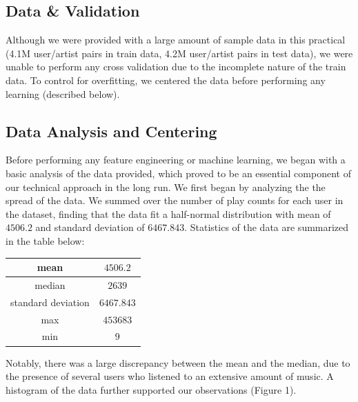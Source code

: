 \documentclass[10pt]{article}
\begin{document}
\subsection{Data \& Validation}
Although we were provided with a large amount of sample data in this practical (4.1M user/artist pairs in train data, 4.2M user/artist pairs in test data), we were unable to perform any cross validation due to the incomplete nature of the train data. To control for overfitting, we centered the data before performing any learning (described below).

\subsection{Data Analysis and Centering}
Before performing any feature engineering or machine learning, we began with a basic analysis of the data provided, which proved to be an essential component of our technical approach in the long run. We first began by analyzing the the spread of the data. We summed over the number of play counts for each user in the dataset, finding that the data fit a half-normal distribution with mean of $4506.2$ and standard deviation of $6467.843$. Statistics of the data are summarized in the table below:

\begin{center}
 \begin{tabular}{c c} 
\hline
\hline
mean & $4506.2$ \\
\hline
median &  $2639$ \\
\hline
standard deviation & $6467.843$ \\
\hline
max & $453683$ \\
\hline
min & $9$ \\ 
\hline
\hline
\end{tabular}
\end{center}

Notably, there was a large discrepancy between the mean and the median, due to the presence of several users who listened to an extensive amount of music. A histogram of the data further supported our observations (Figure 1).
\end{document}
